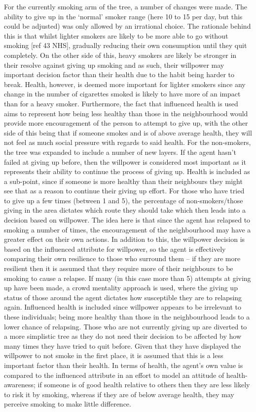 \documentclass[]{report}
\begin{document}
For the currently smoking arm of the tree, a number of changes were made. The ability to give up in the `normal' smoker range (here 10 to 15 per day, but this could be adjusted) was only allowed by an irrational choice. The rationale behind this is that whilst lighter smokers are likely to be more able to go without smoking [ref 43 NHS], gradually reducing their own consumption until they quit completely. On the other side of this, heavy smokers are likely be stronger in their resolve against giving up smoking and as such, their willpower may important decision factor than their health due to the habit being harder to break. Health, however, is deemed more important for lighter smokers since any change in the number of cigarettes smoked is likely to have more of an impact than for a heavy smoker. Furthermore, the fact that influenced health is used aims to represent how being less healthy than those in the neighbourhood would provide more encouragement of the person to attempt to give up, with the other side of this being that if someone smokes and is of above average health, they will not feel as much social pressure with regards to said health.
For the non-smokers, the tree was expanded to include a number of new layers. If the agent hasn't failed at giving up before, then the willpower is considered most important as it represents their ability to continue the process of giving up. Health is included as a sub-point, since if someone is more healthy than their neighbours they might see that as a reason to continue their giving up effort. For those who have tried to give up a few times (between 1 and 5), the percentage of non-smokers/those giving in the area dictates which route they should take which then leads into a decision based on willpower. The idea here is that since the agent has relapsed to smoking a number of times, the encouragement of the neighbourhood may have a greater effect on their own actions. In addition to this, the willpower decision is based on the influenced attribute for willpower, so the agent is effectively comparing their own resilience to those who surround them – if they are more resilient then it is assumed that they require more of their neighbours to be smoking to cause a relapse. If many (in this case more than 5) attempts at giving up have been made, a crowd mentality approach is used, where the giving up status of those around the agent dictates how susceptible they are to relapsing again. Influenced health is included since willpower appears to be irrelevant to these individuals; being more healthy than those in the neighbourhood leads to a lower chance of relapsing. Those who are not currently giving up are diverted to a more simplistic tree as they do not need their decision to be affected by how many times they have tried to quit before. Given that they have displayed the willpower to not smoke in the first place, it is assumed that this is a less important factor than their health. In terms of health, the agent's own value is compared to the influenced attribute in an effort to model an attitude of health-awareness; if someone is of good health relative to others then they are less likely to risk it by smoking, whereas if they are of below average health, they may perceive smoking to make little difference. 
\end{document}
